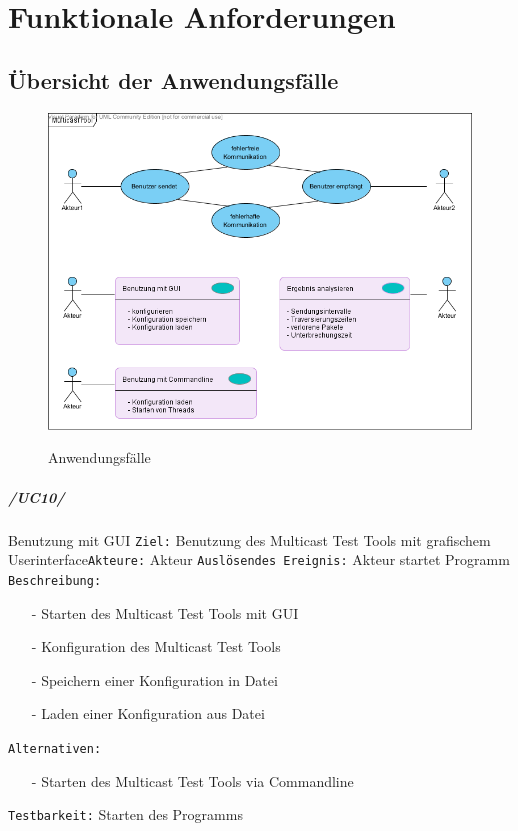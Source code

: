\chapter{Funktionale Anforderungen}
\label{cha:funct}

\section{Übersicht der Anwendungsfälle}
\label{sec:usec}

\begin{figure}[H]
\includegraphics[width=15cm]{images/UseCasesUML.png}
\label{img:usecasesuml}
\caption{Anwendungsfälle}
\end{figure}

\clearpage

\paragraph{/UC10/} Benutzung mit GUI\newline
\texttt{Ziel:} Benutzung des Multicast Test Tools mit grafischem
Userinterface\newline \texttt{Akteure:} Akteur\newline
\texttt{Auslösendes Ereignis:} Akteur startet Programm\newline
\texttt{Beschreibung:}
\begin{itemize}
 \item[-] Starten des Multicast Test Tools mit GUI
 \item[-] Konfiguration des Multicast Test Tools
 \item[-] Speichern einer Konfiguration in Datei
 \item[-] Laden einer Konfiguration aus Datei
\end{itemize}
\texttt{Alternativen:}
\begin{itemize}
 \item[-] Starten des Multicast Test Tools via Commandline
\end{itemize}
\texttt{Testbarkeit:} Starten des Programms


